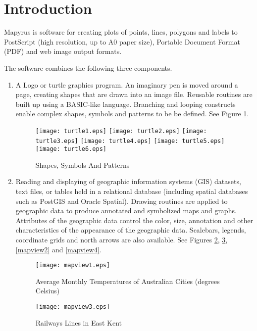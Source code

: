 
\section{Introduction}

Mapyrus is software for creating plots of points, lines, polygons and labels 
to PostScript (high resolution, up to A0 paper size),
Portable Document Format (PDF) and web image output formats.

The software combines the following three components.

\begin{enumerate}
\item

A Logo or turtle graphics program.  An imaginary pen is moved around a page,
creating shapes that are drawn into an image file.
Reusable routines are built up using a BASIC-like language.
Branching and looping constructs enable complex shapes, symbols and patterns
to be be defined.  See Figure \ref{turtle}.

\begin{figure}[h]
\texttt{[image: turtle1.eps]}
\texttt{[image: turtle2.eps]}
\texttt{[image: turtle3.eps]}
\texttt{[image: turtle4.eps]}
\texttt{[image: turtle5.eps]}
\texttt{[image: turtle6.eps]}
\caption{Shapes, Symbols And Patterns}
\label{turtle}
\end{figure}

\item

Reading and displaying of geographic information
systems (GIS) datasets, text files, or tables held in a relational database
(including spatial databases such as PostGIS and Oracle Spatial).
Drawing routines are applied to geographic data to produce annotated and
symbolized maps and graphs.  Attributes of the geographic data control
the color, size, annotation and other characteristics of the
appearance of the geographic data.
Scalebars, legends, coordinate grids and north arrows are also available.
See Figures \ref{mapview1}, \ref{mapview3}, \ref{mapview2} and
\ref{mapview4}.

\begin{figure}
\texttt{[image: mapview1.eps]}
\caption[Average Monthly Temperatures]{Average Monthly Temperatures of Australian Cities (degrees Celsius)}
\label{mapview1}
\end{figure}

\begin{figure}
\texttt{[image: mapview3.eps]}
\caption{Railways Lines in East Kent}
\label{mapview3}
\end{figure}


\end{enumerate}
